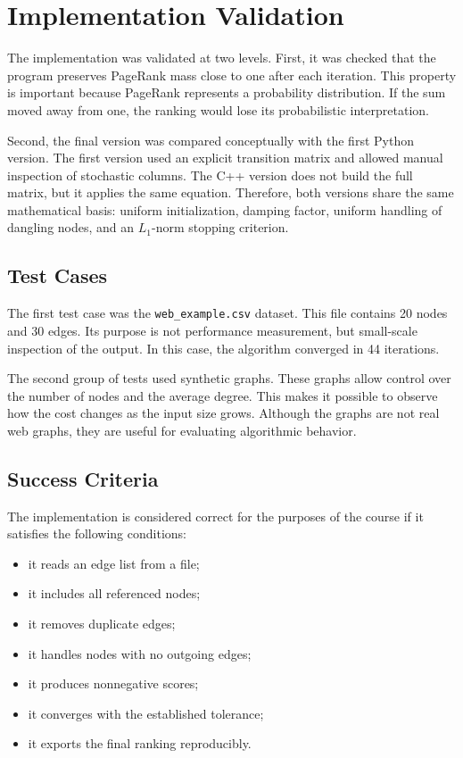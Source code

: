 \documentclass[runningheads]{llncs}
\begin{document}
\section{Implementation Validation}

The implementation was validated at two levels. First, it was checked that the program preserves PageRank mass close to one after each iteration. This property is important because PageRank represents a probability distribution. If the sum moved away from one, the ranking would lose its probabilistic interpretation.

Second, the final version was compared conceptually with the first Python version. The first version used an explicit transition matrix and allowed manual inspection of stochastic columns. The C++ version does not build the full matrix, but it applies the same equation. Therefore, both versions share the same mathematical basis: uniform initialization, damping factor, uniform handling of dangling nodes, and an \(L_1\)-norm stopping criterion.

\subsection{Test Cases}

The first test case was the \texttt{web\_example.csv} dataset. This file contains 20 nodes and 30 edges. Its purpose is not performance measurement, but small-scale inspection of the output. In this case, the algorithm converged in 44 iterations.

The second group of tests used synthetic graphs. These graphs allow control over the number of nodes and the average degree. This makes it possible to observe how the cost changes as the input size grows. Although the graphs are not real web graphs, they are useful for evaluating algorithmic behavior.

\subsection{Success Criteria}

The implementation is considered correct for the purposes of the course if it satisfies the following conditions:

\begin{itemize}
\item it reads an edge list from a file;
\item it includes all referenced nodes;
\item it removes duplicate edges;
\item it handles nodes with no outgoing edges;
\item it produces nonnegative scores;
\item it converges with the established tolerance;
\item it exports the final ranking reproducibly.
\end{itemize}
\end{document}
